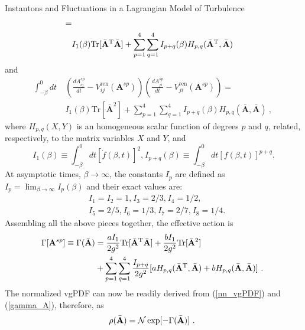 \begin{chapter}{Instantons and Fluctuations in a Lagrangian Model of Turbulence}
\begin{equation}
\begin{split}
= \\ &I_1 (\beta) 
\mathrm{Tr} [ \bar {\mathbf{A}}^{\mathrm{T}} \bar {\mathbf{A}} ] + \sum_{p=1}^4 \sum_{q=1}^4 I_{p+q}  (\beta) H_{p,q}(\bar {\mathbf{A}}^{\mathrm{T}}, \bar {\mathbf{A}})
\end{split}
\end{equation}
and
\begin{equation}
\begin{split}
\int_{-\beta}^0 dt \ &\left( \frac{d A_{ij}^{sp}}{dt} - V_{ij}^{\mathrm{ren}}(\mathbf{A}^{sp}) \right) \left( \frac{d A_{ji}^{sp}}{dt} - V_{ji}^{\mathrm{ren}}(\mathbf{A}^{sp}) \right)
= \\ &I_1 (\beta) 
\mathrm{Tr} [ \bar {\mathbf{A}}^2  ] + \sum_{p=1}^4 \sum_{q=1}^4 I_{p+q} (\beta) H_{p,q}(\bar {\mathbf{A}}, \bar {\mathbf{A}}) \ , \    
\end{split}
\end{equation}
where $H_{p,q}(X,Y)$ is an homogeneous scalar function of degrees $p$ and $q$, related, 
respectively, to the matrix variables $X$ and $Y$, and
\begin{equation}
 I_1 (\beta)  \equiv \int_{-\beta}^0 d t [ \dot f(\beta, t) ]^2 \mbox{,}
 \ I_{p+q} (\beta) \equiv \int_{-\beta}^0 d t [ f(\beta, t) ]^{p+q} \mbox{.}
\end{equation}
At asymptotic times, $\beta \rightarrow \infty$, the constants $I_p$ are defined as $I_p = \lim_{\beta \rightarrow \infty } I_p (\beta)$
and their exact values are:
\begin{equation}
\begin{split}
     &I_1 = I_2 = 1 \mbox{,} \  I_3 = 2/3 \mbox{,} \  I_4 = 1/2 \mbox{,}  \nonumber \\
     &I_5 = 2/5 \mbox{,} \  I_6 = 1/3 \mbox{,} \  I_7 = 2/7 \mbox{,} \  I_8 = 1/4 \mbox{.}
\end{split}
\end{equation}
Assembling all the above pieces together, the effective action is
\begin{equation}\label{gamma_A}
\begin{split}
\Gamma[{\mathbf{A}}^{sp}] \equiv \Gamma( \bar {\mathbf{A}}) &= \frac{aI_1}{2 g^2} \mathrm{Tr} [ \bar {\mathbf{A}}^\T \bar {\mathbf{A}} ] + \frac{bI_1}{2 g^2} \mathrm{Tr} [ \bar {\mathbf{A}}^2  ]
 \\ &+ \sum_{p=1}^4 \sum_{q=1}^4 \frac{I_{p+q}}{2g^2} [ a H_{p,q}(\bar {\mathbf{A}}^\T, \bar {\mathbf{A}})
 + b H_{p,q}(\bar {\mathbf{A}}, \bar {\mathbf{A}}) ] \ . \ 
\end{split}
\end{equation}
The normalized vgPDF can now be readily derived from (\ref{nn_vgPDF}) and (\ref{gamma_A}), therefore, as 
\begin{equation}\rho(\bar {\mathbf{A}}) = {\cal{N}} \exp [ - \Gamma(\bar {\mathbf{A}}) ] \ . \  \label{n_vgPDF}
\end{equation}


\end{chapter}
